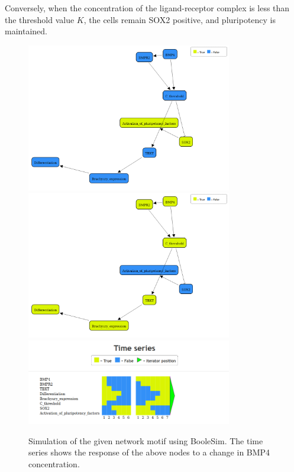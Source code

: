 \documentclass{article} %
\begin{document}
\begin{enumerate}
    Conversely, when the concentration of the ligand-receptor complex is less than the threshold value $K$, the cells remain SOX2 positive, and pluripotency is maintained.

    \begin{figure}[htpb]
      \centering
      \includegraphics[width=0.8\textwidth]{bool1}
      \includegraphics[width=0.8\textwidth]{bool2}
      \includegraphics[width=0.8\textwidth]{time}
      \caption{Simulation of the given network motif using BooleSim. The time series shows the response of the above nodes to a change in BMP4 concentration.}
      \label{fig:bool1}
    \end{figure}


\end{enumerate}
\end{document}
